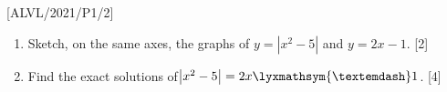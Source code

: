 \item {[}ALVL/2021/P1/2{]}
\begin{enumerate}
\item Sketch, on the same axes, the graphs of $y=\left|x^{2}-5\right|$
and $y=2x-1$.\hfill{} {[}2{]}
\item Find the exact solutions of$\left|x^{2}-5\right|=2x\lyxmathsym{\textemdash}1$.
\hfill{}{[}4{]}
\end{enumerate}
